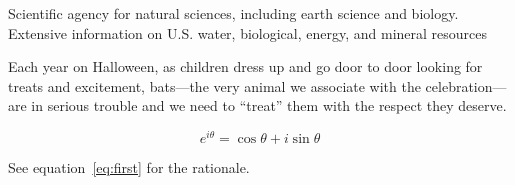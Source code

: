 \documentclass[11pt]{article}
\begin{document}
Scientific agency for natural sciences, including earth science and biology. Extensive information on U.S. water, biological, energy, and mineral resources


Each year on Halloween, as children dress up and go door to door looking for treats and excitement, bats---the very animal we associate with the celebration---are in serious trouble and we need to ``treat'' them with the respect they deserve.

\begin{equation}
e^{i\theta}=\cos \theta + i \sin \theta
\label{eq:first}
\end{equation}

See equation~\ref{eq:first} for the rationale.
\end{document}
